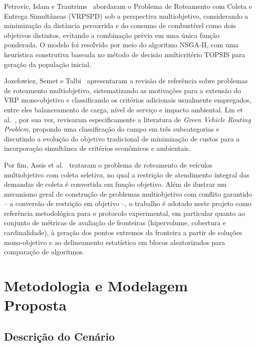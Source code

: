 \documentclass[12pt,a4paper]{article}
\theoremstyle{plain}
\begin{document}
Petrovic, Islam e Trautrims~\cite{petrovic2023} abordaram o Problema de Roteamento com Coleta e Entrega Simultâneas (VRPSPD) sob a perspectiva multiobjetivo, considerando a minimização da distância percorrida e do consumo de combustível como dois objetivos distintos, evitando a combinação prévia em uma única função ponderada. O modelo foi resolvido por meio do algoritmo NSGA-II, com uma heurística construtiva baseada no método de decisão multicritério TOPSIS para geração da população inicial.

Jozefowiez, Semet e Talbi~\cite{jozefowiez2008} apresentaram a revisão de referência sobre problemas de roteamento multiobjetivo, sistematizando as motivações para a extensão do VRP mono-objetivo e classificando os critérios adicionais usualmente empregados, entre eles balanceamento de carga, nível de serviço e impacto ambiental. Lin et al.~\cite{lin2014}, por sua vez, revisaram especificamente a literatura de \textit{Green Vehicle Routing Problem}, propondo uma classificação do campo em três subcategorias e discutindo a evolução do objetivo tradicional de minimização de custos para a incorporação simultânea de critérios econômicos e ambientais.

Por fim, Assis et al.~\cite{assis2013} trataram o problema de roteamento de veículos multiobjetivo com coleta seletiva, no qual a restrição de atendimento integral das demandas de coleta é convertida em função objetivo. Além de ilustrar um mecanismo geral de construção de problemas multiobjetivo com conflito garantido -- a conversão de restrição em objetivo --, o trabalho é adotado neste projeto como referência metodológica para o protocolo experimental, em particular quanto ao conjunto de métricas de avaliação de fronteiras (hipervolume, cobertura e cardinalidade), à geração dos pontos extremos da fronteira a partir de soluções mono-objetivo e ao delineamento estatístico em blocos aleatorizados para comparação de algoritmos.

\section{Metodologia e Modelagem Proposta}

\subsection{Descrição do Cenário}
\label{sec:cenario}
\end{document}
